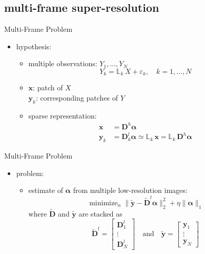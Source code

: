 \documentclass[fleqn,aspectratio=1610]{beamer}
\begin{document}
\subsection{multi-frame super-resolution}
\label{sec:org4df3663}
\begin{frame}[label={sec:orgc56a2b9}]{Multi-Frame Problem}
\begin{itemize}
\item hypothesis:
\begin{itemize}
\item multiple observations: \(Y_1,\dotsc,Y_N\) 
\begin{equation}
  Y_k= \mathbb{L}_k\,X+\varepsilon_k,\quad k=1,\dotsc,N
\end{equation}
\item \(\boldsymbol{x}\): patch of \(X\)\\[0pt]
\(\boldsymbol{y}_k\): corresponding patches of \(Y\)
\item sparse representation:
\begin{align}
  \boldsymbol{x}&=\mathbf{D}^{h}\boldsymbol{\alpha}\\
  \boldsymbol{y}_k&=\mathbf{D}^{l}_{k}\boldsymbol{\alpha}
                    \simeq \mathbb{L}_{k}\,\boldsymbol{x}
                    =\mathbb{L}_{k}\,\mathbf{D}^{h}\boldsymbol{\alpha}
\end{align}
\end{itemize}
\end{itemize}
\end{frame}
\begin{frame}[label={sec:org449491f}]{Multi-Frame Problem}
\begin{itemize}
\item problem:
\begin{itemize}
\item estimate of \(\boldsymbol{\alpha}\) from multiple low-resolution images:
\begin{equation}
  \mathop{\text{minimize}}_{\alpha}
  \|\tilde{\boldsymbol{y}}-\tilde{\mathbf{D}}^{l}\boldsymbol{\alpha}\|_2^2
  +\eta\|\boldsymbol{\alpha}\|_1
\end{equation}
where \(\tilde{\mathbf{D}}\) and \(\tilde{\boldsymbol{y}}\) are stacked as
\begin{equation}
  \tilde{\mathbf{D}}^{l}
  =
  \begin{bmatrix}
    \mathbf{D}^{l}_{1}\\\vdots\\\mathbf{D}^{l}_{N}
  \end{bmatrix}
  \quad\text{and}\quad
  \tilde{\boldsymbol{y}}
  =
  \begin{bmatrix}
    \boldsymbol{y}_1\\\vdots\\\boldsymbol{y}_N
  \end{bmatrix}
\end{equation}
\end{itemize}
\end{itemize}
\end{frame}
\end{document}
